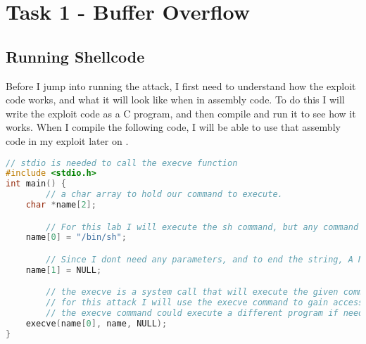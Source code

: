 \documentclass[14pt]{extarticle}
\begin{document}
\section{Task 1 - Buffer Overflow}
\subsection{Running Shellcode}
  Before I jump into running the attack, I first need to understand how the exploit code works, and what it will look like when in assembly code. To do this I will write the exploit code as a C program, and then compile and run it to see how it works. When I compile the following code, I will be able to use that assembly code in my exploit later on \cite{seed-bof}.
\begin{lstlisting}[language=c]
// stdio is needed to call the execve function
#include <stdio.h>
int main() {
		// a char array to hold our command to execute.
    char *name[2];

		// For this lab I will execute the sh command, but any command could be executed here
    name[0] = "/bin/sh";

		// Since I dont need any parameters, and to end the string, A NULL will be set to the last value of the string
    name[1] = NULL;

		// the execve is a system call that will execute the given command.
		// for this attack I will use the execve command to gain access to a shell with elevated permissions
		// the execve command could execute a different program if needed, but a shell will work for this lab
    execve(name[0], name, NULL);
}
\end{lstlisting}
\end{document}
